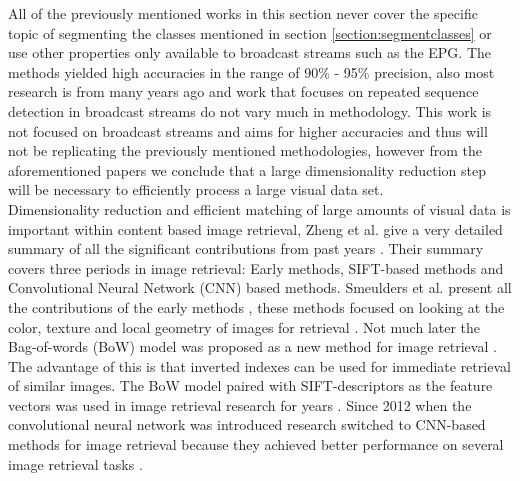 \documentclass{article}
\begin{document}
All of the previously mentioned works in this section never cover the specific topic of segmenting the classes mentioned in section \ref{section:segmentclasses} or use other properties only available to broadcast streams such as the EPG. The methods yielded high accuracies in the range of 90\% - 95\% precision, also most research is from many years ago and work that focuses on repeated sequence detection in broadcast streams do not vary much in methodology. This work is not focused on broadcast streams and aims for higher accuracies and thus will not be replicating the previously mentioned methodologies, however from the aforementioned papers we conclude that a large dimensionality reduction step will be necessary to efficiently process a large visual data set.
\\

Dimensionality reduction and efficient matching of large amounts of visual data is important within content based image retrieval, Zheng et al. give a very detailed summary of all the significant contributions from past years \cite{zheng2018sift}. Their summary covers three periods in image retrieval: Early methods, SIFT-based methods and Convolutional Neural Network (CNN) based methods. Smeulders et al. present all the contributions of the early methods \cite{smeulders2000content}, these methods focused on looking at the color, texture and local geometry of images for retrieval \cite{yu2002color,manjunath1996texture}. Not much later the Bag-of-words (BoW) model was proposed as a new method for image retrieval \cite{sivic2003video}. The advantage of this is that inverted indexes can be used for immediate retrieval of similar images. The BoW model paired with SIFT-descriptors \cite{lowe2004distinctive} as the feature vectors was used in image retrieval research for years \cite{nister2006scalable,philbin2007object,jegou2008hamming,jegou2010aggregating,jegou2012aggregating}. Since 2012 when the convolutional neural network was introduced \cite{krizhevsky2012imagenet} research switched to CNN-based methods for image retrieval because they achieved better performance on several image retrieval tasks	 \cite{babenko2014neural,yue2015exploiting, tolias2015particular}.


\iffalse
\cite{li2000automatic} %

\cite{lienhart1997detection} %
\cite{covell2006advertisement} %

\cite{gauch2006finding} %
\cite{wang2008multimodal} %
\end{document}
